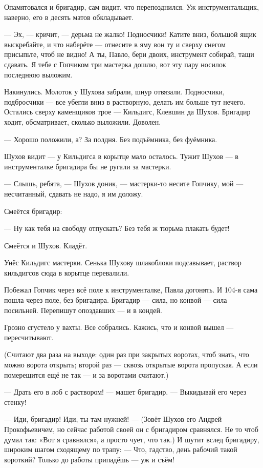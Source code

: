 Опамятовался и бригадир, сам видит, что перепозднился. Уж инструментальщик, наверно, его в
десять матов обкладывает.

--- Эх, --- кричит, --- дерьма не жалко! Подносчики! Катите вниз, большой ящик выскребайте, и что
наберёте --- отнесите в яму вон ту и сверху снегом присыпьте, чтоб не видно! А ты, Павло, бери
двоих, инструмент собирай, тащи сдавать. Я тебе с Гопчиком три мастерка дошлю, вот эту пару
носилок последнюю выложим.

Накинулись. Молоток у Шухова забрали, шнур отвязали. Подносчики, подбросчики --- все убегли
вниз в растворную, делать им больше тут нечего. Остались сверху каменщиков трое --- Кильдигс,
Клевшин да Шухов. Бригадир ходит, обсматривает, сколько выложили. Доволен.

--- Хорошо положили, а? За полдня. Без подъёмника, без фуёмника.

Шухов видит --- у Кильдигса в корытце мало осталось. Тужит Шухов --- в инструменталке бригадира
бы не ругали за мастерки.

--- Слышь, ребята, --- Шухов доник, --- мастерки-то несите Гопчику, мой --- несчитанный, сдавать не
надо, я им доложу.

Смеётся бригадир:

--- Ну как тебя на свободу отпускать? Без тебя ж тюрьма плакать будет!

Смеётся и Шухов. Кладёт.

Унёс Кильдигс мастерки. Сенька Шухову шлакоблоки подсавывает, раствор кильдигсов сюда в
корытце перевалили.

Побежал Гопчик через всё поле к инструменталке, Павла догонять. И 104-я сама пошла через поле,
без бригадира. Бригадир --- сила, но конвой --- сила посильней. Перепишут опоздавших --- и в
кондей.

Грозно сгустело у вахты. Все собрались. Кажись, что и конвой вышел --- пересчитывают.

(Считают два раза на выходе: один раз при закрытых воротах, чтоб знать, что можно ворота
открыть; второй раз --- сквозь открытые ворота пропуская. А если померещится ещё не так --- и за
воротами считают.)

--- Драть его в лоб с раствором! --- машет бригадир. --- Выкидывай его через стенку!

--- Иди, бригадир! Иди, ты там нужней! --- (Зовёт Шухов его Андрей Прокофьевичем, но сейчас
работой своей он с бригадиром сравнялся. Не то чтоб думал так: «Вот я сравнялся», а просто
чует, что так.) И шутит вслед бригадиру, широким шагом сходящему по трапу: --- Что, гадство, день
рабочий такой короткий? Только до работы припадёшь --- уж и съём!

